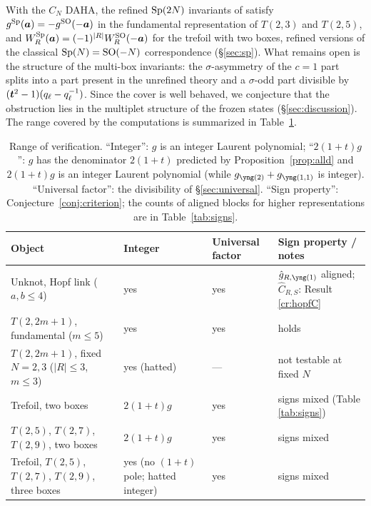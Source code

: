 With the $C_N$ DAHA, the refined $\mathrm{Sp}(2N)$ invariants of \cite{AM22} satisfy $g^{\mathrm{Sp}}(\bm{a}) = -g^{\mathrm{SO}}(-\bm{a})$ in the fundamental representation of $T(2,3)$ and $T(2,5)$, and $W_R^{\mathrm{Sp}}(\bm{a}) = (-1)^{|R|}W_R^{\mathrm{SO}}(-\bm{a})$ for the trefoil with two boxes, refined versions of the classical $\mathrm{Sp}(N) = \mathrm{SO}(-N)$ correspondence (\S\ref{sec:sp}). What remains open is the structure of the multi-box invariants: the $\sigma$-asymmetry of the $c = 1$ part splits into a part present in the unrefined theory and a $\sigma$-odd part divisible by $(\bm{t}^2 - 1)(q_\ell - q_\ell^{-1})$. Since the cover is well behaved, we conjecture that the obstruction lies in the multiplet structure of the frozen states (\S\ref{sec:discussion}). The range covered by the computations is summarized in Table~\ref{tab:summary}.

\begin{table}[htbp]
\centering
\small
\caption{Range of verification. ``Integer'': $g$ is an integer Laurent polynomial; ``$2(1+t)g$'': $g$ has the denominator $2(1+t)$ predicted by Proposition~\ref{prop:alld} and $2(1+t)g$ is an integer Laurent polynomial (while $g_{\ytwo} + g_{\yoneone}$ is integer). ``Universal factor'': the divisibility of \S\ref{sec:universal}. ``Sign property'': Conjecture~\ref{conj:criterion}; the counts of aligned blocks for higher representations are in Table~\ref{tab:signs}.}\label{tab:summary}
\setlength{\tabcolsep}{4pt}
\begin{tabular}{>{\raggedright\arraybackslash}p{5.0cm}>{\raggedright\arraybackslash}p{2.4cm}>{\raggedright\arraybackslash}p{2.0cm}>{\raggedright\arraybackslash}p{5.2cm}}
\toprule
Object & Integer & Universal factor & Sign property / notes \\
\midrule
\addlinespace
Unknot, Hopf link ($a, b \le 4$) & yes & yes & $\hat g_{R,\yone}$ aligned; $\hat C_{R,S}$: Result \ref{cr:hopfC} \\
\addlinespace
$T(2,2m+1)$, fundamental ($m \le 5$) & yes & yes & holds \\
\addlinespace
$T(2,2m+1)$, fixed $N = 2, 3$ ($|R| \le 3$, $m \le 3$) & yes (hatted) & --- & not testable at fixed $N$ \\
\addlinespace
Trefoil, two boxes & $2(1+t)g$ & yes & signs mixed (Table \ref{tab:signs}) \\
\addlinespace
$T(2,5)$, $T(2,7)$, $T(2,9)$, two boxes & $2(1+t)g$ & yes & signs mixed \\
\addlinespace
Trefoil, $T(2,5)$, $T(2,7)$, $T(2,9)$, three boxes & yes (no $(1+t)$ pole; hatted integer) & yes & signs mixed \\

\end{tabular}
\end{table}
